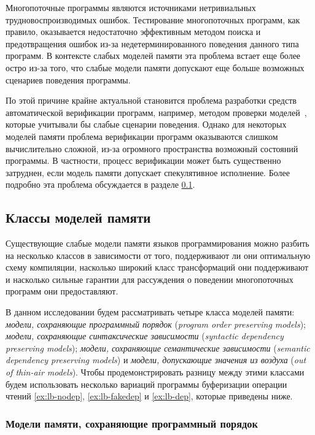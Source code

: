 Многопоточные программы являются источниками нетривиальных
трудновоспроизводимых ошибок. 
Тестирование многопоточных программ, как правило, 
оказывается недостаточно эффективным методом поиска 
и предотвращения ошибок из-за недетерминированного 
поведения данного типа программ.
В контексте слабых моделей памяти эта проблема встает еще более остро 
из-за того, что слабые модели памяти допускают еще больше 
возможных сценариев поведения программы. 

По этой причине крайне актуальной становится проблема
разработки средств автоматической верификации программ, 
например, методом проверки моделей~\cite{Baier:2008},
которые учитывали бы слабые сценарии поведения.
Однако для некоторых моделей памяти проблема верификации 
программ оказываются слишком вычислительно сложной, 
из-за огромного пространства возможный состояний программы. 
В частности, процесс верификации может быть существенно затруднен, 
если модель памяти допускает спекулятивное исполнение.
Более подробно эта проблема обсуждается в разделе \ref{sec:models-classes}.  

\subsection{Классы моделей памяти}
\label{sec:models-classes}

Существующие слабые модели памяти языков программирования 
можно разбить на несколько классов в зависимости от того, 
поддерживают ли они оптимальную схему компиляции, 
насколько широкий класс трансформаций они поддерживают 
и насколько сильные гарантии для рассуждения о поведении многопоточных программ
они предоставляют. 

В данном исследовании будем рассматривать четыре класса моделей памяти: 
\emph{модели, сохраняющие программный порядок}
(\emph{program order preserving models}); 
\emph{модели, сохраняющие синтаксические зависимости} 
(\emph{syntactic dependency preserving models});
\emph{модели, сохраняющие семантические зависимости} 
(\emph{semantic dependency preserving models}) и 
\emph{модели, допускающие значения из воздуха} 
(\emph{out of thin-air models}).
Чтобы продемонстрировать разницу между этими классами 
будем использовать несколько вариаций программы 
буферизации операции чтений 
\ref{ex:lb-nodep}, \ref{ex:lb-fakedep} и \ref{ex:lb-dep}, 
которые приведены ниже. 



\subsubsection*{Модели памяти, сохраняющие программный порядок}


